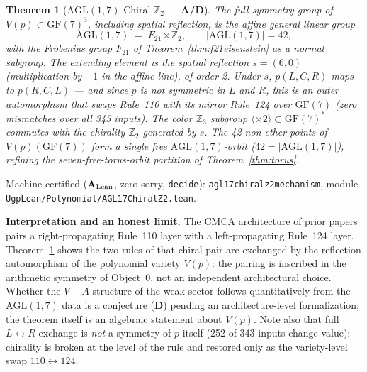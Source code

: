 \documentclass[11pt]{article}
\newtheorem{theorem}{Theorem}[section]
\theoremstyle{remark}
\newcommand{\GF}[1]{\ensuremath{\mathrm{GF}(#1)}}
\newcommand{\lean}[1]{%
  \penalty-100
  \begingroup\def\_{\textunderscore\allowbreak}\texttt{#1}\endgroup}
\newcommand{\CatAL}{\texorpdfstring{\ensuremath{\textbf{A}_{\rm Lean}}}{A-Lean}}
\newcommand{\CatAD}{\textbf{A/D}}
\newcommand{\CatD}{\textbf{D}}
\begin{document}
\begin{theorem}[$\mathrm{AGL}(1,7)$ Chiral $\mathbb{Z}_2$ --- \CatAD{}]
\label{thm:agl17}
The full symmetry group of $V(p) \subset \GF{7}^3$, including spatial
reflection, is the affine general linear group
\[
  \mathrm{AGL}(1,7) \;=\; F_{21} \rtimes \mathbb{Z}_2,
  \qquad |\mathrm{AGL}(1,7)| = 42,
\]
with the Frobenius group $F_{21}$ of Theorem~\ref{thm:f21eisenstein} as a
normal subgroup. The extending element is the spatial reflection
$s = (6,0)$ (multiplication by $-1$ in the affine line), of order 2. Under
$s$, $p(L,C,R)$ maps to $p(R,C,L)$ --- and since $p$ is not symmetric in
$L$ and $R$, this is an outer automorphism that swaps Rule~110 with its
mirror Rule~124 over $\GF{7}$ (zero mismatches over all 343 inputs). The
color $\mathbb{Z}_3$ subgroup $\langle \times 2\rangle \subset \GF{7}^*$
commutes with the chirality $\mathbb{Z}_2$ generated by $s$. The 42
non-ether points of $V(p)(\GF{7})$ form a single free
$\mathrm{AGL}(1,7)$-orbit ($42 = |\mathrm{AGL}(1,7)|$), refining the
seven-free-torus-orbit partition of Theorem~\ref{thm:torus}.
\end{theorem}

{\sloppy\noindent Machine-certified (\CatAL{}, zero sorry, \lean{decide}):
\lean{agl17\_chiral\_z2\_mechanism}, module
\lean{UgpLean/Polynomial/AGL17ChiralZ2.lean}.\par}

\medskip
\noindent\textbf{Interpretation and an honest limit.}
The CMCA architecture of prior papers~\cite{SpivackCMCA,
SpivackThreeTapeCMCA} pairs a right-propagating Rule~110 layer with a
left-propagating Rule~124 layer. Theorem~\ref{thm:agl17} shows the two
rules of that chiral pair are exchanged by the reflection automorphism of
the polynomial variety $V(p)$: the pairing is inscribed in the arithmetic
symmetry of Object~0, not an independent architectural choice. Whether the
$V{-}A$ structure of the weak sector follows quantitatively from the
$\mathrm{AGL}(1,7)$ data is a conjecture (\CatD{}) pending an
architecture-level formalization; the theorem itself is an algebraic
statement about $V(p)$. Note also that full $L \leftrightarrow R$ exchange
is \emph{not} a symmetry of $p$ itself (252 of 343 inputs change value):
chirality is broken at the level of the rule and restored only as the
variety-level swap $110 \leftrightarrow 124$.
\end{document}
